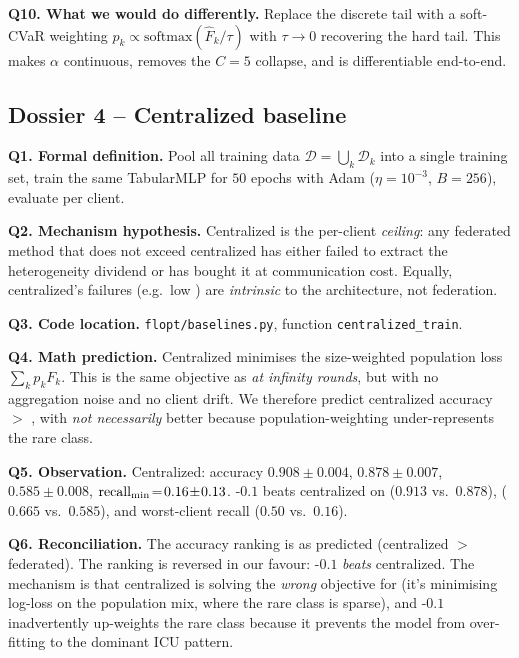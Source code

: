 \textbf{Q10. What we would do differently.}
Replace the discrete tail with a soft-CVaR weighting
$p_k \propto \mathrm{softmax}(\hat F_k / \tau)$ with $\tau \!\to\! 0$
recovering the hard tail. This makes $\alpha$ continuous, removes the
$C\!=\!5$ collapse, and is differentiable end-to-end.

\subsection{Dossier 4 -- Centralized baseline}
\label{sec:dossier-centralized}

\textbf{Q1. Formal definition.}
Pool all training data $\mathcal{D} = \bigcup_k \mathcal{D}_k$ into a
single training set, train the same TabularMLP for $50$ epochs with
Adam ($\eta\!=\!10^{-3}$, $B\!=\!256$), evaluate per client.

\textbf{Q2. Mechanism hypothesis.}
Centralized is the per-client \emph{ceiling}: any federated method
that does not exceed centralized has either failed to extract the
heterogeneity dividend or has bought it at communication cost. Equally,
centralized's failures (e.g.\ low \auprc{}) are
\emph{intrinsic} to the architecture, not federation.

\textbf{Q3. Code location.}
\texttt{flopt/baselines.py}, function \texttt{centralized\_train}.

\textbf{Q4. Math prediction.}
Centralized minimises the size-weighted population loss
$\sum_k p_k F_k$. This is the same objective as \fedavg{} \emph{at
infinity rounds}, but with no aggregation noise and no client drift.
We therefore predict centralized accuracy $>$ \fedavg{}, with
\auprc{} \emph{not necessarily} better because population-weighting
under-represents the rare class.

\textbf{Q5. Observation.}
Centralized: accuracy $0.908 \!\pm\! 0.004$, \auroc{}
$0.878 \!\pm\! 0.007$, \auprc{} $0.585 \!\pm\! 0.008$,
$\text{recall}_{\min}{}\!=\!0.16 \!\pm\! 0.13$. \fedprox{}-$0.1$ beats centralized
on \auroc{} ($0.913$ vs.\ $0.878$), \auprc{} ($0.665$ vs.\ $0.585$),
and worst-client recall ($0.50$ vs.\ $0.16$).

\textbf{Q6. Reconciliation.}
The accuracy ranking is as predicted (centralized $>$ federated). The
\auprc{} ranking is reversed in our favour: \fedprox{}-$0.1$
\emph{beats} centralized. The mechanism is that centralized is
solving the \emph{wrong} objective for \auprc{} (it's minimising
log-loss on the population mix, where the rare class is sparse), and
\fedprox{}-$0.1$ inadvertently up-weights the rare class because it
prevents the model from over-fitting to the dominant ICU pattern.

